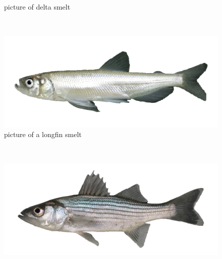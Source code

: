 \documentclass[
]{book}
\begin{document}
\begin{panel-grid}
\begin{columns-nocenter}
\begin{column800}
\begin{figure}
{}

\caption{picture of delta smelt}\label{fig:unnamed-chunk-136}
\end{figure}

\end{column800}

\begin{column40}

~

\end{column40}

\begin{column800}

\begin{figure}

{\centering \includegraphics[width=29.17in]{figures/longfin_smelt_adult} 

}

\caption{picture of a longfin smelt}\label{fig:unnamed-chunk-137}
\end{figure}

\end{column800}

\begin{column40}

~

\end{column40}

\begin{column800}

\begin{figure}

{\centering \includegraphics[width=29.17in]{figures/striped_bass_young_adult} 

}
\end{figure}
\end{column800}
\end{columns-nocenter}
\end{panel-grid}
\end{document}
